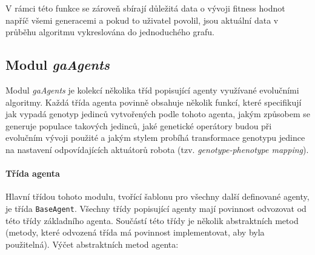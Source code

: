 V rámci této funkce se zároveň sbírají důležitá data o vývoji fitness hodnot
napříč všemi generacemi a pokud to uživatel povolil, jsou aktuální data v
průběhu algoritmu vykreslována do jednoduchého grafu.

\subsection{Modul \emph{gaAgents}} \label{imp:gaAgents}
Modul \emph{gaAgents} je kolekcí několika tříd popisující agenty využívané
evolučními algoritmy. Každá třída agenta povinně obsahuje několik funkcí, které
specifikují jak vypadá genotyp jedinců vytvořených podle tohoto agenta, jakým
způsobem se generuje populace takových jedinců, jaké genetické operátory budou
při evolučním vývoji použité a jakým stylem probíhá transformace genotypu
jedince na nastavení odpovídajících aktuátorů robota (tzv.
\emph{genotype-phenotype mapping}). 

\paragraph{Třída agenta}
Hlavní třídou tohoto modulu, tvořící šablonu pro všechny další definované
agenty, je třída \texttt{BaseAgent}. Všechny třídy popisující agenty mají
povinnost odvozovat od této třídy základního agenta. Součástí této třídy je
několik abstraktních metod (metody, které odvozená třída má povinnost
implementovat, aby byla použitelná). Výčet abstraktních metod agenta:

